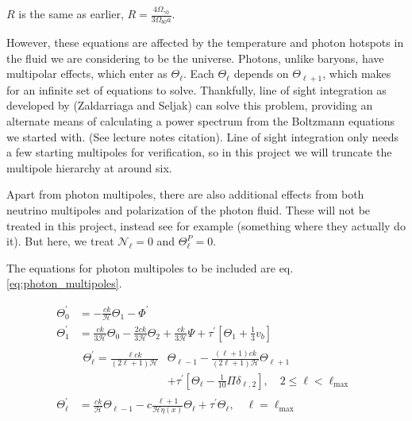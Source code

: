 $R$ is the same as earlier, $R = \frac{4\Omega_{\gamma 0}}{3\Omega_{b 0} a}$.

However, these equations are affected by the temperature and photon hotspots in the fluid we are considering to be the universe. Photons, unlike baryons, have multipolar effects, which enter as $\Theta_\ell$. Each $\Theta_\ell$ depends on $\Theta_{\ell+1}$, which makes for an infinite set of equations to solve. Thankfully, line of sight integration as developed by (Zaldarriaga and Seljak) can solve this problem, providing an alternate means of calculating a power spectrum from the Boltzmann equations we started with. (See lecture notes citation). Line of sight integration only needs a few starting multipoles for verification, so in this project we will truncate the multipole hierarchy at around six.

Apart from photon multipoles, there are also additional effects from both neutrino multipoles and polarization of the photon fluid. These will not be treated in this project, instead see for example (something where they actually do it). But here, we treat $\mathcal{N}_\ell = 0$ and $\Theta^P_\ell = 0$.

The equations for photon multipoles to be included are eq. \ref{eq:photon_multipoles}.

\begin{equation}\label{eq:photon_multipoles}
\boxed{
\begin{aligned}
\Theta^\prime_0 &= -\frac{ck}{\mathcal{H}} \Theta_1 - \Phi^\prime \\
\Theta^\prime_1 &=  \frac{ck}{3\mathcal{H}} \Theta_0 - \frac{2ck}{3\mathcal{H}}\Theta_2
    + \frac{ck}{3\mathcal{H}}\Psi + \tau^\prime\left[\Theta_1 + \frac{1}{3}v_b\right] \\
&\begin{split}
\Theta^\prime_\ell = \frac{\ell ck}{(2\ell+1)\mathcal{H}}&\Theta_{\ell-1} - \frac{(\ell+1)ck}{(2\ell+1)\mathcal{H}} \Theta_{\ell+1} \\
    &+ \tau^\prime\left[\Theta_\ell - \frac{1}{10}\Pi \delta_{\ell,2}\right], \quad 2 \le \ell < \ell_{\textrm{max}}
    \end{split} \\
\Theta_{\ell}^\prime &= \frac{ck}{\mathcal{H}} \Theta_{\ell-1}
    - c\frac{\ell+1}{\mathcal{H}\eta(x)}\Theta_\ell + \tau^\prime\Theta_\ell, \quad \ell = \ell_{\textrm{max}}\\
\end{aligned}
}
\end{equation}

